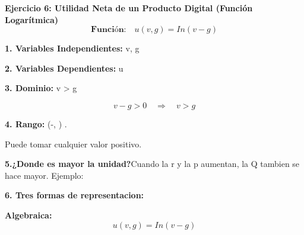 \documentclass[12pt]{article}
\begin{document}
\begin{justify}
\begin{justify}
\begin{justify}
\begin{justify}
\newpage

\begin{justify}
{\Large \textbf{Ejercicio 6: Utilidad Neta de un Producto Digital (Función Logarítmica)}}
\vspace{0.1cm}
\[\textbf{Función:}\quad u(v, g) = In(v-g)\]

\begin{justify}
{\textbf{1. Variables Independientes:}} {\small v, g}
\vspace{0.01cm}
\end{justify}

\begin{justify}
{\textbf{2. Variables Dependientes:}} {\small u}
\vspace{0.01cm}
\end{justify}

\begin{justify}
{\textbf{3. Dominio:}} {\small v > g}
\vspace{0.01cm}
\end{justify}

\begin{center}
\[v-g>0 \quad \Longrightarrow \quad v>g \]
\end{center}

\begin{justify}
{\textbf{4. Rango:}} \smallCualquier (-\infty, \infty) . \quad  
\vspace{0.01cm}
\end{justify}

\begin{justify}
    \small Puede tomar cualquier valor positivo. 
\end{justify}

\begin{justify}
    {\textbf{5.¿Donde es mayor la unidad?}}\quad \small Cuando la r y la p aumentan, la Q tambien se hace mayor. Ejemplo:
    \vspace{0.01cm}
\end{justify}

\begin{justify}
   {\textbf{6. Tres formas de representacion:}}
   \vspace{0.01cm}
\end{justify}

\begin{justify}
    \small\textbf {Algebraica: } \small
\[u(v,g) = In(v-g)\]
\end{justify}


\end{justify}
\end{justify}
\end{justify}
\end{justify}
\end{justify}
\end{document}
